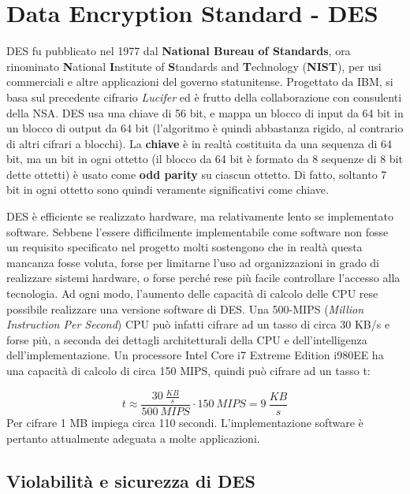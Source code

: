 \section{Data Encryption Standard - DES}
DES fu pubblicato nel 1977 dal \textbf{National Bureau of Standards}, ora rinominato \textbf{N}ational \textbf{I}nstitute of \textbf{S}tandards and \textbf{T}echnology (\textbf{NIST}), per usi commerciali e altre applicazioni del governo statunitense. Progettato da IBM, si basa sul precedente cifrario \textit{Lucifer} ed è frutto della collaborazione con consulenti della NSA. DES usa una chiave di 56 bit, e mappa un blocco di input da 64 bit in un blocco di output da 64 bit (l'algoritmo è quindi abbastanza rigido, al contrario di altri cifrari a blocchi). La \textbf{chiave} è in realtà costituita da una sequenza di 64 bit, ma un bit in ogni ottetto (il blocco da 64 bit è formato da 8 sequenze di 8 bit dette ottetti) è usato come \textbf{odd parity} su ciascun ottetto. Di fatto, soltanto 7 bit in ogni ottetto sono quindi veramente significativi come chiave. \newline \newline

DES è efficiente se realizzato hardware, ma relativamente lento se implementato software. Sebbene l'essere difficilmente implementabile come software non fosse un requisito specificato nel progetto molti sostengono che in realtà questa mancanza fosse voluta, forse per limitarne l'uso ad organizzazioni in grado di realizzare sistemi hardware, o forse perché rese più facile controllare l'accesso alla tecnologia. Ad ogni modo, l'aumento delle capacità di calcolo delle CPU rese possibile realizzare una versione software di DES. Una 500-MIPS (\textit{Million Instruction Per Second}) CPU può infatti cifrare ad un tasso di circa 30 KB/s e forse più, a seconda dei dettagli architetturali della CPU e dell'intelligenza dell'implementazione. Un processore Intel Core i7 Extreme Edition i980EE ha una capacità di calcolo di circa 150 MIPS, quindi può cifrare ad un tasso t:

\begin{equation}
t \approx \frac{30 \: \frac{KB}{s}}{500 \: MIPS} \cdot 150 \: MIPS = 9 \: \frac{KB}{s}
\end{equation}  
Per cifrare 1 MB impiega circa 110 secondi. L’implementazione software è pertanto attualmente adeguata a molte applicazioni.\newline \newline


\subsection{Violabilità e sicurezza di DES}


